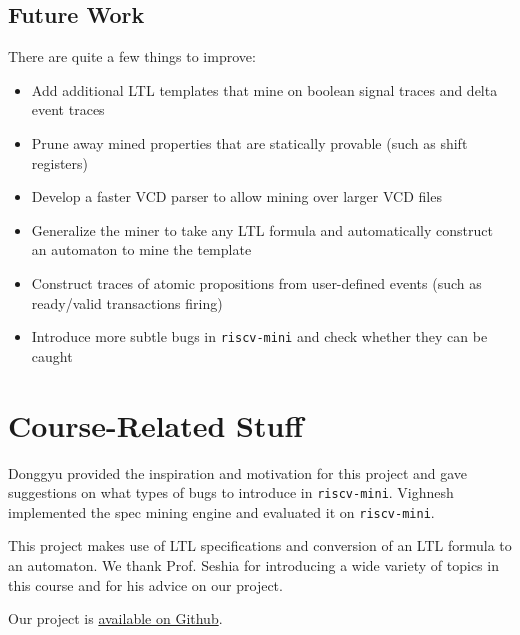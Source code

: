 \documentclass[acmlarge,11pt]{acmart}
\begin{document}
\subsection{Future Work}
There are quite a few things to improve:
\begin{itemize}
  \item Add additional LTL templates that mine on boolean signal traces and delta event traces
  \item Prune away mined properties that are statically provable (such as shift registers)
  \item Develop a faster VCD parser to allow mining over larger VCD files
  \item Generalize the miner to take any LTL formula and automatically construct an automaton to mine the template
  \item Construct traces of atomic propositions from user-defined events (such as ready/valid transactions firing)
  \item Introduce more subtle bugs in \texttt{riscv-mini} and check whether they can be caught
\end{itemize}

\section{Course-Related Stuff}
Donggyu provided the inspiration and motivation for this project and gave suggestions on what types of bugs to introduce in \texttt{riscv-mini}.
Vighnesh implemented the spec mining engine and evaluated it on \texttt{riscv-mini}.

This project makes use of LTL specifications and conversion of an LTL formula to an automaton.
We thank Prof. Seshia for introducing a wide variety of topics in this course and for his advice on our project.

Our project is \href{https://github.com/vighneshiyer/spec-mining/}{available on Github}.



\end{document}
